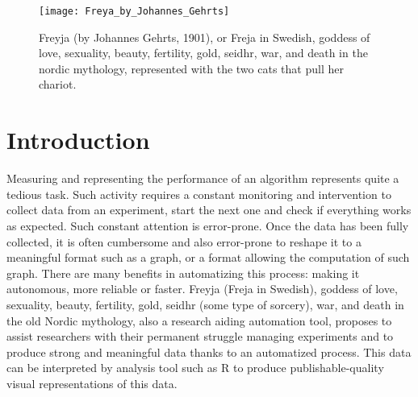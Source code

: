\begin{figure}[h]
\centering
\texttt{[image: Freya\_by\_Johannes\_Gehrts]}
\caption{Freyja (by Johannes Gehrts, 1901), or Freja in Swedish, goddess of love, sexuality, beauty, fertility, gold, seidhr, war, and death in the nordic mythology, represented with the two cats that pull her chariot.}
\end{figure}

\section{Introduction}
Measuring and representing the performance of an algorithm represents quite a tedious task. Such activity requires a constant monitoring and intervention to collect data from an experiment, start the next one and check if everything works as expected.
Such constant attention is error-prone. Once the data has been fully collected, it is often cumbersome and also error-prone to reshape it to a meaningful format such as a graph, or a format allowing the computation of such graph.
There are many benefits in automatizing this process: making it autonomous, more reliable or faster.
Freyja (Freja in Swedish), goddess of love, sexuality, beauty, fertility, gold, seidhr (some type of sorcery), war, and death in the old Nordic mythology, also a research aiding automation tool, proposes to assist researchers with their permanent struggle managing experiments and to produce strong and meaningful data thanks to an automatized process. This data can be interpreted by analysis tool such as R to produce publishable-quality visual representations of this data. 

